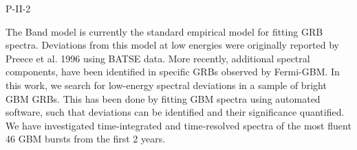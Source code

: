 P-II-2


\bigskip



\bigskip

\noindent The Band model is currently the standard empirical model for fitting GRB spectra. Deviations from this model at low energies were originally reported by Preece et al. 1996 using BATSE data. More recently, additional spectral components, have been identified in specific GRBs observed by Fermi-GBM. In this work, we search for low-energy spectral deviations in a sample of bright GBM GRBs. This has been done by fitting GBM spectra using automated software, such that deviations can be identified and their significance quantified. We have investigated time-integrated and time-resolved spectra of the most fluent 46 GBM bursts from the first 2 years.

